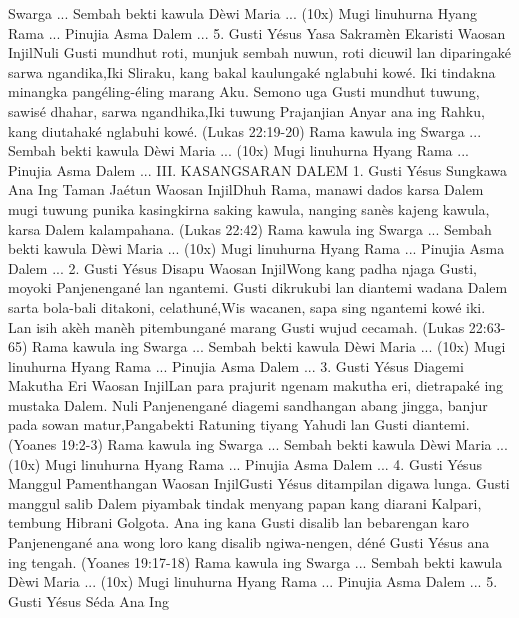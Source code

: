 \documentclass{scrbook}
\begin{document}
Swarga ... {\dag} Sembah bekti kawula D\`ewi Maria ... (10x) {\dag}
Mugi linuhurna Hyang Rama ... {\dag} Pinujia Asma Dalem ...  5. Gusti
Y\'esus Yasa Sakram\`en Ekaristi Waosan InjilNuli Gusti mundhut roti,
munjuk sembah nuwun, roti dicuwil lan diparingak\'e sarwa
ngandika,{\textquotedbl}Iki Sliraku, kang bakal kaulungak\'e nglabuhi
kow\'e. Iki tindakna minangka pang\'eling-\'eling marang Aku. Semono
uga Gusti mundhut tuwung, sawis\'e dhahar, sarwa
ngandhika,{\textquotedbl}Iki tuwung Prajanjian Anyar ana ing Rahku,
kang diutahak\'e nglabuhi kow\'e. (Lukas 22:19-20) {\dag} Rama kawula
ing Swarga ... {\dag} Sembah bekti kawula D\`ewi Maria ... (10x) {\dag}
Mugi linuhurna Hyang Rama ... {\dag} Pinujia Asma Dalem ...  III.
KASANGSARAN DALEM 1. Gusti Y\'esus Sungkawa Ana Ing Taman Ja\'etun
Waosan Injil{\textquotedbl}Dhuh Rama, manawi dados karsa Dalem mugi
tuwung punika kasingkirna saking kawula, nanging san\`es kajeng kawula,
karsa Dalem kalampahana.{\textquotedbl} (Lukas 22:42) {\dag} Rama
kawula ing Swarga ... {\dag} Sembah bekti kawula D\`ewi Maria ... (10x)
{\dag} Mugi linuhurna Hyang Rama ... {\dag} Pinujia Asma Dalem ...  2.
Gusti Y\'esus Disapu Waosan InjilWong kang padha njaga Gusti, moyoki
Panjenengan\'e lan ngantemi. Gusti dikrukubi lan diantemi wadana Dalem
sarta bola-bali ditakoni, celathun\'e,{\textquotedbl}Wis wacanen, sapa
sing ngantemi kow\'e iki. Lan isih ak\`eh man\`eh pitembungan\'e marang
Gusti wujud cecamah. (Lukas 22:63-65) {\dag} Rama kawula ing Swarga ...
{\dag} Sembah bekti kawula D\`ewi Maria ... (10x) {\dag} Mugi linuhurna
Hyang Rama ... {\dag} Pinujia Asma Dalem ...  3. Gusti Y\'esus Diagemi
Makutha Eri Waosan InjilLan para prajurit ngenam makutha eri,
dietrapak\'e ing mustaka Dalem. Nuli Panjenengan\'e diagemi sandhangan
abang jingga, banjur pada sowan matur,{\textquotedbl}Pangabekti
Ratuning tiyang Yahudi{\textquotedbl} lan Gusti
diantemi.{\textquotedbl} (Yoanes 19:2-3) {\dag} Rama kawula ing Swarga
... {\dag} Sembah bekti kawula D\`ewi Maria ... (10x) {\dag} Mugi
linuhurna Hyang Rama ... {\dag} Pinujia Asma Dalem ...  4. Gusti
Y\'esus Manggul Pamenthangan Waosan InjilGusti Y\'esus ditampilan
digawa lunga. Gusti manggul salib Dalem piyambak tindak menyang papan
kang diarani Kalpari, tembung Hibrani Golgota. Ana ing kana Gusti
disalib lan bebarengan karo Panjenengan\'e ana wong loro kang disalib
ngiwa-nengen, d\'en\'e Gusti Y\'esus ana ing tengah.{\textquotedbl}
(Yoanes 19:17-18) {\dag} Rama kawula ing Swarga ... {\dag} Sembah bekti
kawula D\`ewi Maria ... (10x) {\dag} Mugi linuhurna Hyang Rama ...
{\dag} Pinujia Asma Dalem ...  5. Gusti Y\'esus S\'eda Ana Ing
\end{document}
